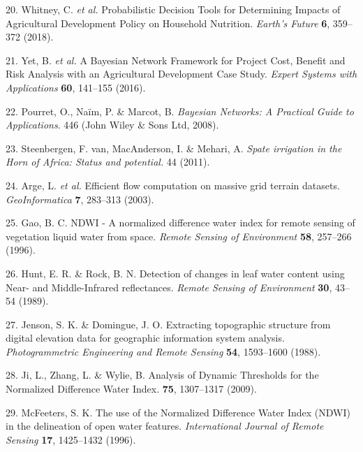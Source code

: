 \documentclass[12pt,oneside]{article}
\begin{document}
\leavevmode\hypertarget{ref-Whitney_et_al_2018a}{}%
20. Whitney, C. \emph{et al.} Probabilistic Decision Tools for
Determining Impacts of Agricultural Development Policy on Household
Nutrition. \emph{Earth's Future} \textbf{6}, 359--372 (2018).

\leavevmode\hypertarget{ref-Yet_et_al_2016}{}%
21. Yet, B. \emph{et al.} A Bayesian Network Framework for Project Cost,
Benefit and Risk Analysis with an Agricultural Development Case Study.
\emph{Expert Systems with Applications} \textbf{60}, 141--155 (2016).

\leavevmode\hypertarget{ref-Pourret_et_al_2008}{}%
22. Pourret, O., Naïm, P. \& Marcot, B. \emph{Bayesian Networks: A
Practical Guide to Applications}. 446 (John Wiley \& Sons Ltd, 2008).

\leavevmode\hypertarget{ref-VanSteenbergen_et_al_2011}{}%
23. Steenbergen, F. van, MacAnderson, I. \& Mehari, A. \emph{Spate
irrigation in the Horn of Africa: Status and potential.} 44 (2011).

\leavevmode\hypertarget{ref-Arge_et_al_2003}{}%
24. Arge, L. \emph{et al.} Efficient flow computation on massive grid
terrain datasets. \emph{GeoInformatica} \textbf{7}, 283--313 (2003).

\leavevmode\hypertarget{ref-Gao_1996}{}%
25. Gao, B. C. NDWI - A normalized difference water index for remote
sensing of vegetation liquid water from space. \emph{Remote Sensing of
Environment} \textbf{58}, 257--266 (1996).

\leavevmode\hypertarget{ref-Hunt_and_Rock_1989}{}%
26. Hunt, E. R. \& Rock, B. N. Detection of changes in leaf water
content using Near- and Middle-Infrared reflectances. \emph{Remote
Sensing of Environment} \textbf{30}, 43--54 (1989).

\leavevmode\hypertarget{ref-Jenson_and_Domingue_1988}{}%
27. Jenson, S. K. \& Domingue, J. O. Extracting topographic structure
from digital elevation data for geographic information system analysis.
\emph{Photogrammetric Engineering and Remote Sensing} \textbf{54},
1593--1600 (1988).

\leavevmode\hypertarget{ref-Ji_et_al_2009}{}%
28. Ji, L., Zhang, L. \& Wylie, B. Analysis of Dynamic Thresholds for
the Normalized Difference Water Index. \textbf{75}, 1307--1317 (2009).

\leavevmode\hypertarget{ref-McFeeters_1996}{}%
29. McFeeters, S. K. The use of the Normalized Difference Water Index
(NDWI) in the delineation of open water features. \emph{International
Journal of Remote Sensing} \textbf{17}, 1425--1432 (1996).
\end{document}
